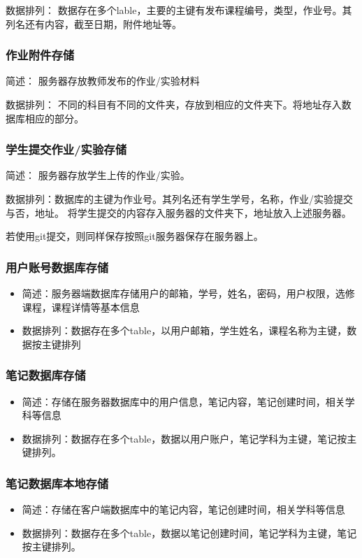 数据排列： 数据存在多个lable，主要的主键有发布课程编号，类型，作业号。其列名还有内容，截至日期，附件地址等。

\subsubsection{作业附件存储}
简述： 服务器存放教师发布的作业/实验材料

数据排列： 不同的科目有不同的文件夹，存放到相应的文件夹下。将地址存入数据库相应的部分。

\subsubsection{学生提交作业/实验存储}
简述： 服务器存放学生上传的作业/实验。

数据排列：数据库的主键为作业号。其列名还有学生学号，名称，作业/实验提交与否，地址。
将学生提交的内容存入服务器的文件夹下，地址放入上述服务器。

若使用git提交，则同样保存按照git服务器保存在服务器上。

\subsubsection{用户账号数据库存储}
\begin{itemize}
\item 简述：服务器端数据库存储用户的邮箱，学号，姓名，密码，用户权限，选修课程，课程详情等基本信息
\item 数据排列：数据存在多个table，以用户邮箱，学生姓名，课程名称为主键，数据按主键排列
\end{itemize}
\subsubsection{笔记数据库存储}
\begin{itemize}
\item 简述：存储在服务器数据库中的用户信息，笔记内容，笔记创建时间，相关学科等信息
\item 数据排列：数据存在多个table，数据以用户账户，笔记学科为主键，笔记按主键排列。
\end{itemize}
\subsubsection{笔记数据库本地存储}
\begin{itemize}
\item 简述：存储在客户端数据库中的笔记内容，笔记创建时间，相关学科等信息
\item 数据排列：数据存在多个table，数据以笔记创建时间，笔记学科为主键，笔记按主键排列。
\end{itemize}
